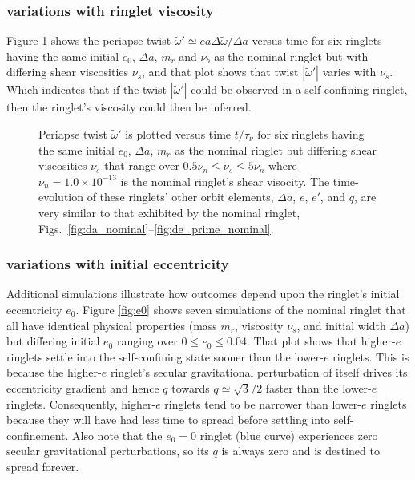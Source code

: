 \documentclass[preprint]{aastex62}
\begin{document}
\subsubsection{variations with ringlet viscosity}
\label{subsec:viscosity-variations}

Figure \ref{fig:wt_prime_vs_time} shows the periapse twist $\tilde{\omega}' \simeq ea\Delta\tilde{\omega}/\Delta a$ 
versus time for six ringlets
having the same initial $e_0$, $\Delta a$, $m_r$ and $\nu_b$ as the nominal ringlet but with differing shear
viscosities $\nu_s$, and that plot shows that twist $|\tilde{\omega}'|$ varies with $\nu_s$. Which indicates that if 
the twist $|\tilde{\omega}'|$ could be observed in a self-confining ringlet, then 
the ringlet's viscosity could then be inferred. 

\begin{figure}
    \caption{
        \label{fig:wt_prime_vs_time}
        Periapse twist $\tilde{\omega}'$ is plotted versus time $t/\tau_\nu$ for six ringlets
        having the same initial $e_0$, $\Delta a$, $m_r$ as the nominal ringlet
        but differing shear viscosities $\nu_s$ that range over $0.5\nu_n\le\nu_s\le5\nu_n$
        where $\nu_n=1.0\times10^{-13}$ is the nominal ringlet's shear visocity.
        The time-evolution of these ringlets' other orbit elements,  $\Delta a$, $e$, $e'$, and $q$,
        are very similar to that exhibited by the nominal ringlet, 
        Figs.\ \ref{fig:da_nominal}--\ref{fig:de_prime_nominal}. 
    }
\end{figure}


\subsubsection{variations with initial eccentricity}
\label{subsec:e-variations}

Additional simulations illustrate how outcomes depend upon the ringlet's initial eccentricity $e_0$.
Figure \ref{fig:e0} shows seven simulations of the nominal ringlet that all have identical
physical properties (mass $m_r$, viscosity $\nu_s$, and initial width $\Delta a$) but differing initial $e_0$ ranging
over $0\le e_0\le 0.04$. That plot shows that higher-$e$ ringlets settle into the
self-confining state sooner than the lower-$e$ ringlets. This is because the higher-$e$ ringlet's
secular gravitational perturbation of itself drives its eccentricity gradient and hence $q$ towards 
$q\simeq\sqrt{3}/2$ faster than the lower-$e$ ringlets. Consequently, 
higher-$e$ ringlets tend to be narrower than lower-$e$ ringlets because they will have had
less time to spread before settling into self-confinement. Also note that the $e_0=0$ ringlet
(blue curve) experiences zero secular gravitational perturbations, so its $q$ is always zero
and is destined to spread forever.
\end{document}
